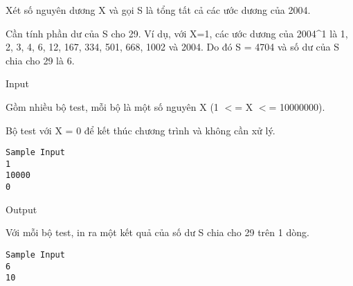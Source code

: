 



   Xét số nguyên dương X và gọi S là tổng tất cả các ước dương của 2004\textasciicircumX .  

   Cần tính phần dư của S cho 29. Ví dụ, với X=1, các ước dương của 2004\textasciicircum1 là 1, 2, 3, 4, 6, 12, 167, 334, 501, 668, 1002 và 2004. Do đó S = 4704  và số dư của S chia cho 29 là 6.  

       Input     

   Gồm nhiều bộ test, mỗi bộ là một số nguyên X (1 $<$= X $<$= 10000000).  

   Bộ test với X = 0 để kết thúc chương trình và không cần xử lý.  
\begin{verbatim}
Sample Input
1 
10000 
0
\end{verbatim}     Output    



   Với mỗi bộ test, in ra một kết quả của số dư S chia cho 29 trên 1 dòng.  
\begin{verbatim}
Sample Input
6 
10 
\end{verbatim}
